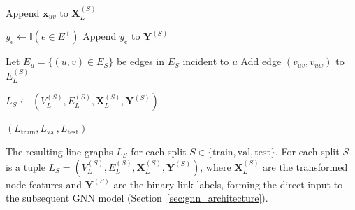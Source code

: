 \documentclass[pdflatex,sn-mathphys-num]{sn-jnl}%
\theoremstyle{thmstyleone}%
\theoremstyle{thmstyletwo}%
\theoremstyle{thmstylethree}%
\theoremstyle{plain} %
\theoremstyle{definition} %
\theoremstyle{remark} %
\theoremstyle{plain} %
\begin{document}
\begin{algorithm}[H]
\begin{algorithmic}[1]
        \State Append $\mathbf{x}_{uv}$ to $\mathbf{X}_L^{(S)}$
  
        \State $y_e \gets \mathbb{I}(e \in E^+)$ 
        \State Append $y_e$ to $\mathbf{Y}^{(S)}$
    \EndFor
    

        \State Let $E_u = \{(u,v) \in E_S\}$ be edges in $E_S$ incident to $u$
            \State Add edge $(v_{uv}, v_{uw})$ to $E_L^{(S)}$
        \EndFor
    \EndFor
    
    \State $L_S \gets \left( V_L^{(S)}, E_L^{(S)}, \mathbf{X}_L^{(S)}, \mathbf{Y}^{(S)} \right)$
\EndFor

\State \Return $(L_{\text{train}}, L_{\text{val}}, L_{\text{test}})$
\end{algorithmic}
\end{algorithm}


The resulting line graphs $L_S$ for each split $S \in \{\text{train}, \text{val}, \text{test}\}$. 
For each split $S$ is a tuple $L_S = (V_L^{(S)}, E_L^{(S)}, \mathbf{X}_L^{(S)}, \mathbf{Y}^{(S)})$, where $\mathbf{X}_L^{(S)}$ are the transformed node features and $\mathbf{Y}^{(S)}$ are the binary link labels, forming the direct input to the subsequent GNN model (Section~\ref{sec:gnn_architecture}).
\end{document}

